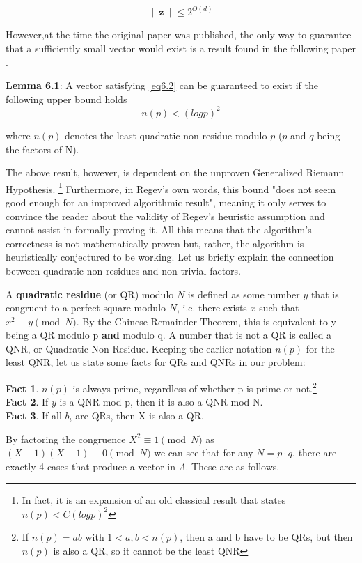 \begin{equation}
    \lVert \mathbf{z} \rVert \leq 2^{O(d)}
    \label{eq6.2}
\end{equation}


However,at the time the original paper was published, the only way to guarantee that a sufficiently small vector would exist is a result found in the following paper \cite{LamzouriLiSoundararajan2015}.

\textbf{Lemma 6.1}: A vector satisfying \eqref{eq6.2} can be guaranteed to exist if the following upper bound holds
\begin{equation}
    n(p) < (logp)^2
\end{equation}

where $n(p)$ denotes the least quadratic non-residue modulo $p$ ($p$ and $q$ being the factors of N).

The above result, however, is dependent on the unproven Generalized Riemann Hypothesis. \footnote{In fact, it is an expansion of an old classical result that states $n(p) < C(logp)^2$} Furthermore, in Regev's own words, this bound "does not seem good enough for an improved algorithmic result", meaning it only serves to convince the reader about the validity of Regev's heuristic assumption and cannot assist in formally proving it. All this means that the algorithm's correctness is not mathematically proven but, rather, the algorithm is heuristically conjectured to be working. Let us briefly explain the connection between quadratic non-residues and non-trivial factors.

A  \textbf{quadratic residue} (or QR) modulo $N$ is defined as some number $y$ that is congruent to a perfect square modulo $N$, i.e. there exists $x$ such that $x^2 \equiv y \pmod N$. By the Chinese Remainder Theorem, this is equivalent to y being a QR modulo p \textbf{and} modulo q. A number that is not a QR is called a QNR, or Quadratic Non-Residue. Keeping the earlier notation $n(p)$ for the least QNR, let us state some facts for QRs and QNRs in our problem:

\textbf{Fact 1}. $n(p)$ is always prime, regardless of whether p is prime or not.\footnote{If $n(p) = ab$ with $1 < a,b < n(p)$, then a and b have to be QRs, but then $n(p)$ is also a QR, so it cannot be the least QNR}\\
\textbf{Fact 2}. If $y$ is a QNR mod p, then it is also a QNR mod N.\\
\textbf{Fact 3}. If all $b_i$ are QRs, then X is also a QR.


By factoring the congruence $X^2 \equiv 1 \pmod N$ as $(X-1)(X+1) \equiv 0 \pmod N$ we can see that for any $N = p \cdot q$, there are exactly 4 cases that produce a vector in $\mathit \Lambda$. These are as follows.

